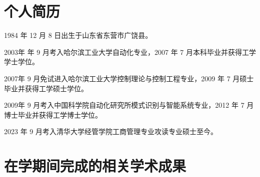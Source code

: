 
\begin{resume}

  \section*{个人简历}

  1984 年 12 月 8 日出生于山东省东营市广饶县。

  2003年 年 9 月考入哈尔滨工业大学自动化专业，2007 年 7 月本科毕业并获得工学学士学位。

  2007年 9 月免试进入哈尔滨工业大学控制理论与控制工程专业，2009 年 7 月硕士毕业并获得工学硕士学位。
  
  2009年 9 月考入中国科学院自动化研究所模式识别与智能系统专业，2012 年 7 月博士毕业并获得工学博士学位。

  2023 年 9 月考入清华大学经管学院工商管理专业攻读专业硕士至今。


  \section*{在学期间完成的相关学术成果}






\end{resume}



